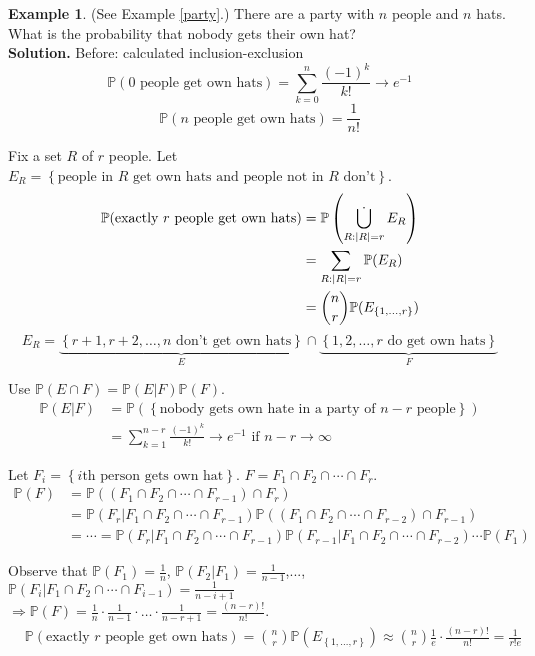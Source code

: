 \documentclass[a4paper,11pt]{amsbook}
\theoremstyle{definition}
\newtheorem{example}{\hspace{-2em} \color{darkblue} Example}[chapter]
\theoremstyle{remark}
\renewcommand{\P}{\mathbb{P}}
\newcommand\0{\varnothing}
\newcommand\BigDisj
{
    \setbox0\hbox{$\displaystyle\bigcup$}
    \rlap{\hbox to \wd0{\hss\raisebox{7.8pt}{$\cdot$}\hss}}\box0
}
\newcommand\bigdisj
{
    \mathop{\mathchoice{\BigDisj}{\scalebox{0.7}{$\BigDisj$}}{\scalebox{0.5}{$\BigDisj$}}{\scalebox{0.4}{$\BigDisj$}}}
}
\begin{document}
    \begin{example}
        (See Example \ref{party}.)
        There are a party with $n$ people and $n$ hats.
        What is the probability that nobody gets their own hat?\\
        \textbf{Solution.} Before: calculated inclusion-exclusion $$\P(\text{0 people get own hats})=\sum_{k=0}^n\frac{(-1)^k}{k!}\to e^{-1}$$
        $$\P(n\text{ people get own hats})=\frac{1}{n!}$$

        Fix a set $R$ of $r$ people. Let $E_R=\left\{\text{people in $R$ get own hats and people not in $R$ don't}\right\}$.
        \begin{align*}
            \P(\text{exactly $r$ people get own hats})&=\P\left(\bigdisj_{R:|R|=r}E_R\right) \\
            &=\sum_{R:|R|=r}\P(E_R) \\
            &=\binom nr\P(E_{\left\{1,\ldots,r\right\}})
        \end{align*}
        $$E_R=\underbrace{\left\{r+1,r+2,\ldots,n\text{ don't get own hats}\right\}}_E\cap\underbrace{\left\{1,2,\ldots,r\text{ do get own hats}\right\}}_F$$
        
        Use $\P(E\cap F)=\P(E|F)\P(F)$.
        \begin{align*}
            \P(E|F)&=\P(\left\{ \text{nobody gets own hate in a party of $n-r$ people} \right\}) \\
            &=\sum_{k=1}^{n-r}\frac{(-1)^k}{k!}\to e^{-1}\text{ if }n-r\to\infty
        \end{align*}
        
        Let $F_i=\left\{i\text{th person gets own hat}\right\}$. $F=F_1\cap F_2\cap\cdots\cap F_r$.
        \begin{align*}
            \P(F)&=\P((F_1\cap F_2\cap\cdots\cap F_{r-1})\cap F_r) \\
            &=\P(F_r|F_1\cap F_2\cap\cdots\cap F_{r-1})\P((F_1\cap F_2\cap\cdots\cap F_{r-2})\cap F_{r-1}) \\
            &=\cdots=\P(F_r|F_1\cap F_2\cap\cdots\cap F_{r-1})\P(F_{r-1}|F_1\cap F_2\cap\cdots\cap F_{r-2})\cdots\P(F_1)
        \end{align*}

        Observe that $\P(F_1)=\frac1n$, $\P(F_2|F_1)=\frac1{n-1}$,..., $\P(F_i|F_1\cap F_2\cap\cdots\cap F_{i-1})=\frac1{n-i+1}$\\
        $\Rightarrow\P(F)=\frac1n\cdot\frac1{n-1}\cdot\ldots\cdot\frac1{n-r+1}=\frac{(n-r)!}{n!}$.
        \begin{align*}
            &\P(\text{exactly $r$ people get own hats})=\binom nr\P(E_{\left\{1,\ldots,r\right\}})\approx\binom nr\frac1e\cdot\frac{(n-r)!}{n!}=\frac1{r!e}
        \end{align*}
    \end{example}
\end{document}

